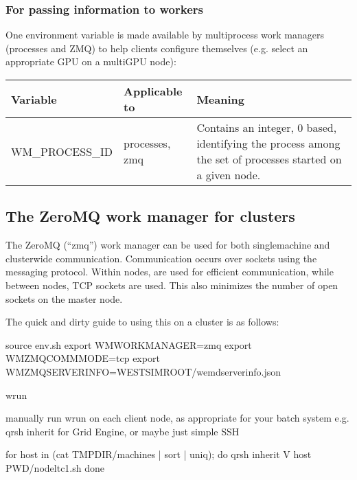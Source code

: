 \documentclass[letterpaper,10pt,english]{sphinxmanual}
\begin{document}
\subsubsection{For passing information to workers}
\label{\detokenize{users_guide/wwmgr:for-passing-information-to-workers}}
One environment variable is made available by multi\sphinxhyphen{}process work managers
(processes and ZMQ) to help clients configure themselves (e.g. select an
appropriate GPU on a multi\sphinxhyphen{}GPU node):


\begin{savenotes}\sphinxattablestart
\centering
\begin{tabulary}{\linewidth}[t]{|T|T|T|}
\hline
\sphinxstyletheadfamily 
Variable
&\sphinxstyletheadfamily 
Applicable to
&\sphinxstyletheadfamily 
Meaning
\\
\hline
WM\_PROCESS\_ID
&
processes, zmq
&
Contains an integer, 0 based, identifying the
process among the set of processes started on a
given node.
\\
\hline
\end{tabulary}
\par
\sphinxattableend\end{savenotes}


\subsection{The ZeroMQ work manager for clusters}
\label{\detokenize{users_guide/wwmgr:the-zeromq-work-manager-for-clusters}}
The ZeroMQ (“zmq”) work manager can be used for both single\sphinxhyphen{}machine and
cluster\sphinxhyphen{}wide communication. Communication occurs over sockets using the  messaging protocol. Within nodes,  are used for efficient
communication, while between nodes, TCP sockets are used. This also minimizes
the number of open sockets on the master node.

The quick and dirty guide to using this on a cluster is as follows:

\begin{sphinxVerbatim}[commandchars=\\\{\}]
source env.sh
export WM\PYGZus{}WORK\PYGZus{}MANAGER=zmq
export WM\PYGZus{}ZMQ\PYGZus{}COMM\PYGZus{}MODE=tcp
export WM\PYGZus{}ZMQ\PYGZus{}SERVER\PYGZus{}INFO=\PYGZdl{}WEST\PYGZus{}SIM\PYGZus{}ROOT/wemd\PYGZus{}server\PYGZus{}info.json

w\PYGZus{}run \PYGZam{}

\PYGZsh{} manually run w\PYGZus{}run on each client node, as appropriate for your batch system
\PYGZsh{} e.g. qrsh \PYGZhy{}inherit for Grid Engine, or maybe just simple SSH

for host in \PYGZdl{}(cat \PYGZdl{}TMPDIR/machines | sort | uniq); do
   qrsh \PYGZhy{}inherit \PYGZhy{}V \PYGZdl{}host \PYGZdl{}PWD/node\PYGZhy{}ltc1.sh \PYGZam{}
done
\end{sphinxVerbatim}
\end{document}
